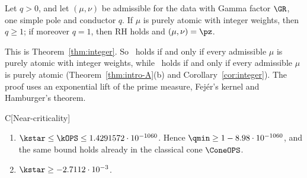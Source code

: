 \begin{introthm}
Let $q>0$, and let $(\mu,\nu)$ be admissible for the data with Gamma factor $\GR$, one simple pole and conductor $q$. If $\mu$ is purely atomic
with integer weights, then $q\ge1$; if moreover $q=1$, then RH holds and $(\mu,\nu)=\pz$.
\end{introthm}

This is Theorem~\ref{thm:integer}. So \condU\ holds if and only if every admissible $\mu$ is purely atomic with integer weights, while \condS\
holds if and only if every admissible $\mu$ is purely atomic (Theorem~\ref{thm:intro-A}(b) and Corollary~\ref{cor:integer}). The proof uses an
exponential lift of the prime measure, Fej\'er's kernel and Hamburger's theorem.

\begin{lthm}{C}[Near-criticality]\label{thm:intro-C}
\begin{enumerate}[label=\textup{(\alph*)}]
\item $\kstar\le\kOPS\le1.4291572\cdot10^{-1060}$. Hence $\qmin\ge1-8.98\cdot10^{-1060}$, and the same bound holds already in the
classical cone $\ConeOPS$.
\item $\kstar\ge-2.7112\cdot10^{-3}$.
\end{enumerate}
\end{lthm}

